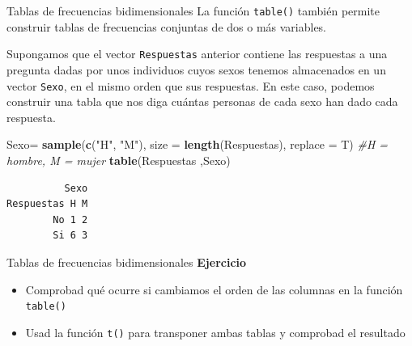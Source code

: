 \documentclass[
  ignorenonframetext,
]{beamer}
\newenvironment{Shaded}{\begin{snugshade}}{\end{snugshade}}
\newcommand{\AttributeTok}[1]{\textcolor[rgb]{0.13,0.29,0.53}{#1}}
\newcommand{\CommentTok}[1]{\textcolor[rgb]{0.56,0.35,0.01}{\textit{#1}}}
\newcommand{\FunctionTok}[1]{\textcolor[rgb]{0.13,0.29,0.53}{\textbf{#1}}}
\newcommand{\NormalTok}[1]{#1}
\newcommand{\OtherTok}[1]{\textcolor[rgb]{0.56,0.35,0.01}{#1}}
\newcommand{\StringTok}[1]{\textcolor[rgb]{0.31,0.60,0.02}{#1}}
\providecommand{\tightlist}{%
  \setlength{\itemsep}{0pt}\setlength{\parskip}{0pt}}
\begin{document}
\begin{frame}[fragile]{Tablas de frecuencias bidimensionales}
\label{tablas-de-frecuencias-bidimensionales}
La función \texttt{table()} también permite construir tablas de
frecuencias conjuntas de dos o más variables.

Supongamos que el vector \texttt{Respuestas} anterior contiene las
respuestas a una pregunta dadas por unos individuos cuyos sexos tenemos
almacenados en un vector \texttt{Sexo}, en el mismo orden que sus
respuestas. En este caso, podemos construir una tabla que nos diga
cuántas personas de cada sexo han dado cada respuesta.

\begin{Shaded}
\begin{Highlighting}[]
\NormalTok{Sexo}\OtherTok{=} \FunctionTok{sample}\NormalTok{(}\FunctionTok{c}\NormalTok{(}\StringTok{"H"}\NormalTok{, }\StringTok{"M"}\NormalTok{), }\AttributeTok{size =} \FunctionTok{length}\NormalTok{(Respuestas), }\AttributeTok{replace =}\NormalTok{ T) }\CommentTok{\#H = hombre, M = mujer}
\FunctionTok{table}\NormalTok{(Respuestas ,Sexo)}
\end{Highlighting}
\end{Shaded}

\begin{verbatim}
          Sexo
Respuestas H M
        No 1 2
        Si 6 3
\end{verbatim}
\end{frame}

\begin{frame}[fragile]{Tablas de frecuencias bidimensionales}
\label{tablas-de-frecuencias-bidimensionales-1}
\textbf{Ejercicio}

\begin{itemize}
\tightlist
\item
  Comprobad qué ocurre si cambiamos el orden de las columnas en la
  función \texttt{table()}
\item
  Usad la función \texttt{t()} para transponer ambas tablas y comprobad
  el resultado
\end{itemize}
\end{frame}
\end{document}
